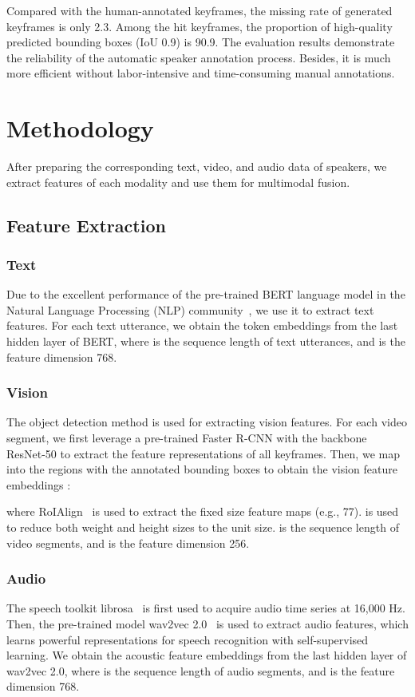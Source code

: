 \documentclass[sigconf,camera-ready]{acmart}
\begin{document}
Compared with the human-annotated keyframes, the missing rate of generated keyframes is only 2.3. Among the hit keyframes, the proportion of high-quality predicted bounding boxes  (IoU  0.9) is 90.9. The evaluation results demonstrate the reliability of the automatic speaker annotation process. Besides, it is much more efficient without labor-intensive and time-consuming manual annotations. 

\section{Methodology}
After preparing the corresponding text, video, and audio data of speakers, we extract features of each modality and use them for multimodal fusion.

\subsection{Feature Extraction}

\subsubsection{Text} Due to the excellent performance of the pre-trained BERT language model in the Natural Language Processing (NLP) community~\cite{BERT}, we use it to extract text features. For each text utterance, we obtain the token embeddings    from the last hidden layer of BERT, where  is the sequence length of text utterances, and  is the feature dimension 768.

\subsubsection{Vision} The object detection method is used for extracting vision features. For each video segment, we first leverage a pre-trained Faster R-CNN with the backbone ResNet-50 to extract the feature representations  of all keyframes. Then, we map  into the regions with the annotated bounding boxes  to obtain the vision feature embeddings :

where RoIAlign~\cite{he2017mask} is used to extract the fixed size feature maps (e.g., 77).  is used to reduce both weight and height sizes to the unit size.  is the sequence length of video segments, and  is the feature dimension 256.

\subsubsection{Audio}
The speech toolkit librosa~\cite{mcfee2015librosa}  is first used to acquire audio time series at 16,000 Hz. Then, the pre-trained model wav2vec 2.0~\cite{baevski2020wav2vec}   is used to extract audio features, which learns powerful representations for speech recognition with self-supervised learning. We obtain the acoustic feature embeddings  from the last hidden layer of wav2vec 2.0, where  is the sequence length of audio segments, and  is the feature dimension 768.
\end{document}
